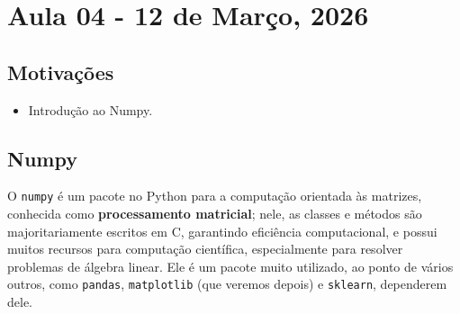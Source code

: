 \documentclass[../numerical_methods.tex]{subfiles}
\begin{document}
\section{Aula 04 - 12 de Março, 2026}
\subsection{Motivações}
\begin{itemize}
	\item Introdução ao Numpy.
\end{itemize}
\subsection{Numpy}
O \texttt{numpy} é um pacote no Python para a computação orientada às matrizes, conhecida como \textbf{ processamento matricial}; nele, as classes e métodos são majoritariamente escritos em C, garantindo eficiência computacional, e possui muitos recursos para computação científica, especialmente para resolver problemas de álgebra linear.
Ele é um pacote muito utilizado, ao ponto de vários outros, como \texttt{pandas}, \texttt{matplotlib} (que veremos depois) e \texttt{sklearn}, dependerem dele.
\end{document}
